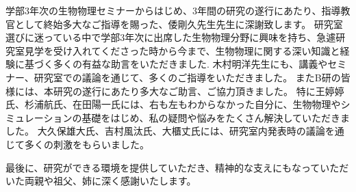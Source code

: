 学部3年次の生物物理セミナーからはじめ、3年間の研究の遂行にあたり、指導教官として終始多大なご指導を賜った、倭剛久先生先生に深謝致します。
研究室選びに迷っている中で学部3年次に出席した生物物理分野に興味を持ち、急遽研究室見学を受け入れてくださった時から今まで、生物物理に関する深い知識と経験に基づく多くの有益な助言をいただきました. 
木村明洋先生にも、講義やセミナー、研究室での議論を通じて、多くのご指導をいただきました。
またB研の皆様には、本研究の遂行にあたり多大なご助言、ご協力頂きました。
特に王婷婷氏、杉浦航氏、在田陽一氏には、右も左もわからなかった自分に、生物物理やシミュレーションの基礎をはじめ、私の疑問や悩みをたくさん解決していただきました。
大久保雄大氏、吉村風汰氏、大櫃丈氏には、研究室内発表時の議論を通じて多くの刺激をもらいました。

最後に、研究ができる環境を提供していただき、精神的な支えにもなっていただいた両親や祖父、姉に深く感謝いたします。